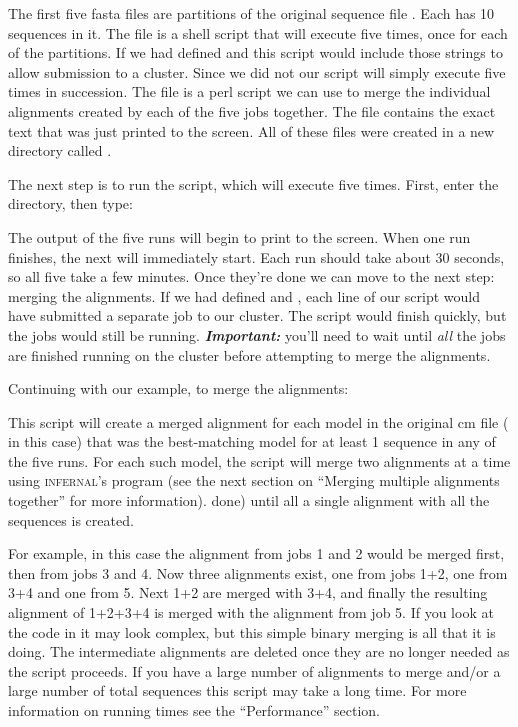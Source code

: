 The first five fasta files are partitions of the original sequence
file . Each has 10 sequences in it. The file
 is a shell script that will execute
 five times, once for each of the partitions. 
If we had defined  and
 this script would include those strings to
allow submission to a cluster. Since we did not our script will simply
execute  five times in succession. The file
 is a perl script we can use to merge the
individual alignments created by each of the five jobs together.
The  file contains the exact text that was just
printed to the screen. All of these files were created in a new
directory called .

The next step is to run the  script, which will
execute  five times. First, enter the
 directory, then type:


The output of the five  runs will begin to print to
the screen. When one run finishes, the next will immediately
start. Each run should take about 30 seconds, so all five take a few
minutes. Once they're done we can move to the next step: merging the
alignments. If we had defined  and
, each line of our script would have submitted
a separate job to our cluster. The script would finish quickly, but
the jobs would still be running. \textbf{\emph{Important: }} you'll
need to wait until \emph{all} the jobs are finished running on the
cluster before attempting to merge the alignments. 

Continuing with our example, to merge the alignments:

This script will create a merged alignment for each model in the
original cm file ( in this case) that was the
best-matching model for at least 1 sequence in any of the five runs.
For each such model, the script will merge two alignments at a time
using \textsc{infernal}'s  program (see the next section
on ``Merging multiple alignments together'' for more information).
done) until all a single alignment with all the sequences is
created. 

For example, in this case the alignment from jobs 1 and 2 would be
merged first, then from jobs 3 and 4. Now three alignments exist, one
from jobs 1+2, one from 3+4 and one from 5. Next 1+2 are merged with
3+4, and finally the resulting alignment of 1+2+3+4 is merged with the
alignment from job 5. If you look at the code in
 it may look complex, but this simple binary
merging is all that it is doing. The intermediate alignments are
deleted once they are no longer needed as the script proceeds. If you
have a large number of alignments to merge and/or a large number of total
sequences this script may take a long time. For more information on
running times see the ``Performance'' section.

